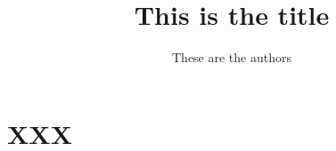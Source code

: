 \documentclass[11pt]{article}
\title{This is the title}
\author{These are the authors}
\newcommand{\0}{\V{0}}
\newcommand{\1}{\V{1}}
\begin{document}
\maketitle

\section{XXX}



\end{document}
